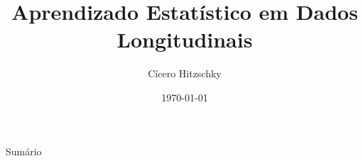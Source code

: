 \documentclass{libs/ufc_format}
\title[Aprendizado Estatístico em Dados Longitudinais]{\huge\textbf{Aprendizado Estatístico em Dados Longitudinais}}
\subtitle{}
\author{Cícero Hitzschky}
\institute[UFC]{
    \normalsize{\email{cicero.hitzschky@alu.ufc.br}}
    \newline
    \department{Departamento de Estatística e Matemática Aplicada}
    \newline
    \ufc
}
\date{\today}
\begin{document}


\begin{frame}{}
    \maketitle
\end{frame}

\begin{frame}{Sumário}
    \begin{multicols}{2}
        \tableofcontents
    \end{multicols}
\end{frame}






\end{document}
